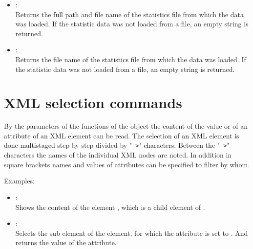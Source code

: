 \begin{itemize}

\item
{}:\\
Returns the full path and file name of the statistics file from which the data was loaded.
If the statistic data was not loaded from a file, an empty string is returned.

\item
{}:\\
Returns the file name of the statistics file from which the data was loaded.
If the statistic data was not loaded from a file, an empty string is returned.

\end{itemize}



\chapter{XML selection commands}

By the parameters of the functions of the  object the content of the
value or of an attribute of an XML element can be read.
The selection of an XML element is done multistaged step by step divided by
"\texttt{->}" characters. Between the "\texttt{->}" characters the names of the individual XML nodes are
noted. In addition in square brackets names and values of attributes can be specified to filter by whom.

Examples:

\begin{itemize}

\item
{}:\\
Shows the content of the element , which is a child element of .

\item
{}:\\
Selects the  sub element of the  element, for
which the  attribute is set to . And returns the value of the
 attribute.

\end{itemize}